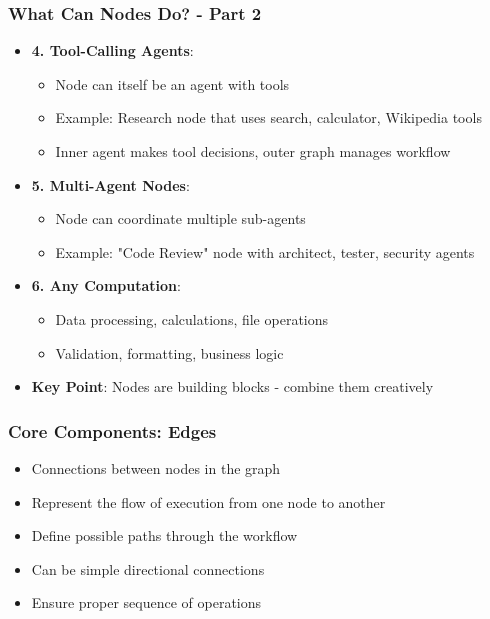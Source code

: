 \begin{frame}[fragile]\frametitle{What Can Nodes Do? - Part 2}
      \begin{itemize}
        \item \textbf{4. Tool-Calling Agents}:
        \begin{itemize}
            \item Node can itself be an agent with tools
            \item Example: Research node that uses search, calculator, Wikipedia tools
            \item Inner agent makes tool decisions, outer graph manages workflow
        \end{itemize}
        \item \textbf{5. Multi-Agent Nodes}:
        \begin{itemize}
            \item Node can coordinate multiple sub-agents
            \item Example: "Code Review" node with architect, tester, security agents
        \end{itemize}
        \item \textbf{6. Any Computation}:
        \begin{itemize}
            \item Data processing, calculations, file operations
            \item Validation, formatting, business logic
        \end{itemize}
        \item \textbf{Key Point}: Nodes are building blocks - combine them creatively
      \end{itemize}
\end{frame}


\begin{frame}[fragile]\frametitle{Core Components: Edges}
      \begin{itemize}
        \item Connections between nodes in the graph
        \item Represent the flow of execution from one node to another
        \item Define possible paths through the workflow
        \item Can be simple directional connections
        \item Ensure proper sequence of operations
      \end{itemize}
\end{frame}

